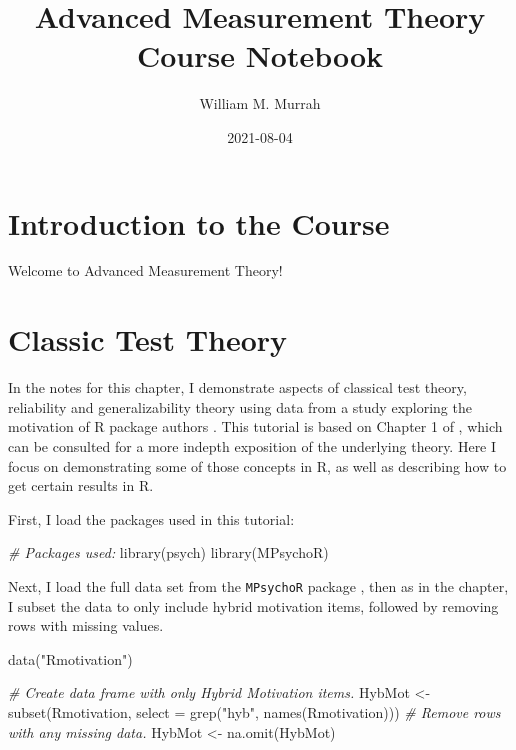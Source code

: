 \documentclass[
]{book}
\title{Advanced Measurement Theory Course Notebook}
\author{William M. Murrah}
\date{2021-08-04}
\newenvironment{Shaded}{\begin{snugshade}}{\end{snugshade}}
\newcommand{\AttributeTok}[1]{\textcolor[rgb]{0.77,0.63,0.00}{#1}}
\newcommand{\CommentTok}[1]{\textcolor[rgb]{0.56,0.35,0.01}{\textit{#1}}}
\newcommand{\FunctionTok}[1]{\textcolor[rgb]{0.00,0.00,0.00}{#1}}
\newcommand{\NormalTok}[1]{#1}
\newcommand{\OtherTok}[1]{\textcolor[rgb]{0.56,0.35,0.01}{#1}}
\newcommand{\StringTok}[1]{\textcolor[rgb]{0.31,0.60,0.02}{#1}}
\begin{document}
\maketitle

{
\setcounter{tocdepth}{1}
\tableofcontents
}
\hypertarget{introduction-to-the-course}{%
\chapter*{Introduction to the Course}\label{introduction-to-the-course}}

Welcome to Advanced Measurement Theory!

\hypertarget{CCT}{%
\chapter{Classic Test Theory}\label{CCT}}

In the notes for this chapter, I demonstrate aspects of classical test theory, reliability and generalizability theory using data from a study exploring the motivation of R package authors \citep{mair2015motivation}.
This tutorial is based on Chapter 1 of \citet{mair2018modern}, which can be consulted for a more indepth exposition of the underlying theory.
Here I focus on demonstrating some of those concepts in R, as well as describing how to get certain results in R.

First, I load the packages used in this tutorial:

\begin{Shaded}
\begin{Highlighting}[]
\CommentTok{\# Packages used:}
\FunctionTok{library}\NormalTok{(psych)}
\FunctionTok{library}\NormalTok{(MPsychoR)}
\end{Highlighting}
\end{Shaded}

Next, I load the full data set from the \texttt{MPsychoR} package \citep{Mair2020mpsychor}, then as in the chapter, I subset the data to only include hybrid motivation items, followed by removing rows with missing values.

\begin{Shaded}
\begin{Highlighting}[]
\FunctionTok{data}\NormalTok{(}\StringTok{"Rmotivation"}\NormalTok{)}

\CommentTok{\# Create data frame with only Hybrid Motivation items.}
\NormalTok{HybMot }\OtherTok{\textless{}{-}} \FunctionTok{subset}\NormalTok{(Rmotivation, }
                        \AttributeTok{select =} \FunctionTok{grep}\NormalTok{(}\StringTok{"hyb"}\NormalTok{, }\FunctionTok{names}\NormalTok{(Rmotivation)))}
\CommentTok{\# Remove rows  with any missing data.}
\NormalTok{HybMot }\OtherTok{\textless{}{-}} \FunctionTok{na.omit}\NormalTok{(HybMot)}
\end{Highlighting}
\end{Shaded}
\end{document}
